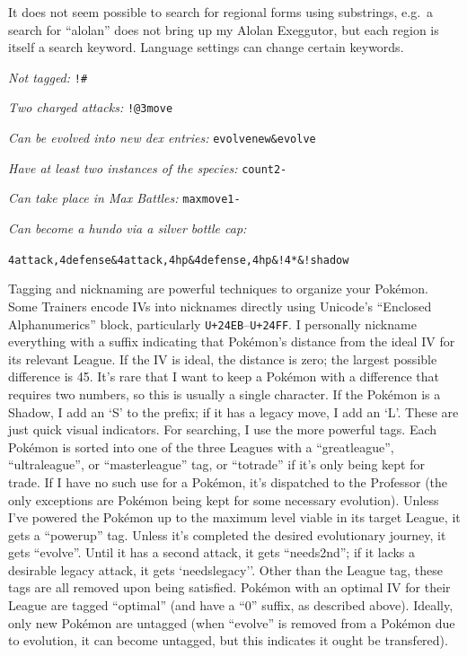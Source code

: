 It does not seem possible to search for regional forms using substrings,
 e.g.\ a search for ``alolan'' does not bring up my Alolan Exeggutor,
 but each region is itself a search keyword.
Language settings can change certain keywords.
\begin{tipbox}[title=Some useful search strings]
\footnotesize
\raggedright
\textit{Not tagged:} \texttt{!\#}

\textit{Two charged attacks:} \texttt{!@3move}

\textit{Can be evolved into new dex entries:} \texttt{evolvenew\&evolve}

\textit{Have at least two instances of the species:} \texttt{count2-}

\textit{Can take place in Max Battles:} \texttt{maxmove1-}

\textit{Can become a hundo via a silver bottle cap:}

\texttt{4attack,4defense\&4attack,4hp\&4defense,4hp\&!4*\&!shadow}
\end{tipbox}
Tagging and nicknaming are powerful techniques to organize your Pokémon.
Some Trainers encode IVs into nicknames directly using Unicode's ``Enclosed Alphanumerics'' block,
 particularly \texttt{U+24EB}--\texttt{U+24FF}.
I personally nickname everything with a suffix indicating that Pokémon's distance from the ideal IV for its relevant League.
If the IV is ideal, the distance is zero; the largest possible difference is 45.
It's rare that I want to keep a Pokémon with a difference that requires two numbers,
 so this is usually a single character.
If the Pokémon is a Shadow, I add an `S' to the prefix; if it has a legacy move, I add an `L'.
These are just quick visual indicators.
For searching, I use the more powerful tags.
Each Pokémon is sorted into one of the three Leagues with a ``greatleague'', ``ultraleague'',
 or ``masterleague'' tag, or ``totrade'' if it's only being kept for trade.
If I have no such use for a Pokémon, it's dispatched to the Professor (the only exceptions are Pokémon being kept for some necessary evolution).
Unless I've powered the Pokémon up to the maximum level viable in its target League, it
 gets a ``powerup'' tag.
Unless it's completed the desired evolutionary journey, it gets ``evolve''.
Until it has a second attack, it gets ``needs2nd''; if it lacks a desirable legacy attack, it gets `needslegacy''.
Other than the League tag, these tags are all removed upon being satisfied.
Pokémon with an optimal IV for their League are tagged ``optimal'' (and have a ``0'' suffix, as described above).
Ideally, only new Pokémon are untagged (when ``evolve'' is removed from a Pokémon due to
 evolution, it can become untagged, but this indicates it ought be transfered).

